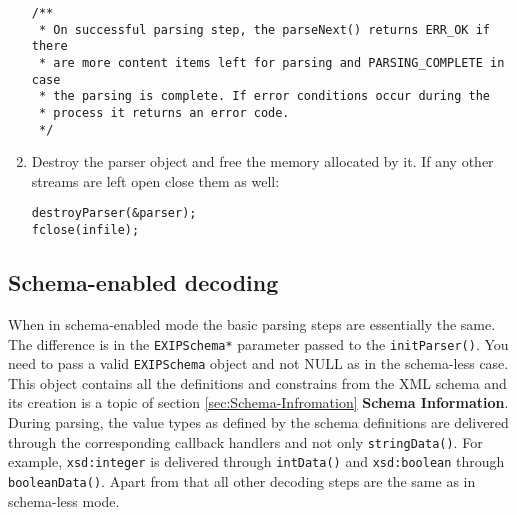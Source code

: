 \begin{enumerate}
\begin{lstlisting}
/**
 * On successful parsing step, the parseNext() returns ERR_OK if there
 * are more content items left for parsing and PARSING_COMPLETE in case
 * the parsing is complete. If error conditions occur during the
 * process it returns an error code.
 */
\end{lstlisting}

 \item Destroy the parser object and free the memory allocated by it. If any other
streams are left open close them as well:
\begin{lstlisting}
destroyParser(&parser);
fclose(infile);
\end{lstlisting}

\end{enumerate}
\subsection{Schema-enabled decoding}
When in schema-enabled mode the basic parsing steps are essentially the same.
The difference is in the \texttt{EXIPSchema*} parameter passed to the \texttt{initParser()}.
You need to pass a valid \texttt{EXIPSchema} object and not NULL as in the schema-less
case. This object contains all the definitions and constrains from the XML schema and
its creation is a topic of section \ref{sec:Schema-Infromation} \textbf{Schema Information}.
During parsing, the value types as defined by the schema definitions
are delivered through the corresponding callback handlers and not only \texttt{stringData()}.
For example, \texttt{xsd:integer} is delivered through \texttt{intData()} and
\texttt{xsd:boolean} through \texttt{booleanData()}. Apart from that all other decoding steps
are the same as in schema-less mode.